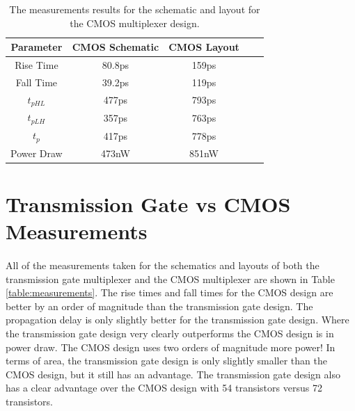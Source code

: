 \documentclass{article}
\begin{document}
  \begin{table}[H]
    \centering
    \footnotesize
    \begin{tabular}{|c|c|c|c|c|}
      \hline
      \textbf{Parameter} & \textbf{CMOS Schematic} & \textbf{CMOS Layout} \\
      \hline
      Rise Time & 80.8ps & 159ps \\
      \hline
      Fall Time & 39.2ps & 119ps\\
      \hline
      $t_{pHL}$ & 477ps & 793ps\\
      \hline
      $t_{pLH}$ & 357ps & 763ps\\
      \hline
      $t_{p}$ & 417ps & 778ps\\
      \hline
      Power Draw & 473nW & 851nW \\
     \hline
    \end{tabular}
    \caption{The measurements results for the schematic and layout for the CMOS multiplexer design.}
    \label{table:cmosmeas}
  \end{table}

\section{Transmission Gate vs CMOS Measurements}
  \paragraph{}
  All of the measurements taken for the schematics and layouts of both the transmission gate multiplexer and the CMOS multiplexer are shown in Table \ref{table:measurements}. The rise times and fall times for the CMOS design are better by an order of magnitude than the transmission gate design. The propagation delay is only slightly better for the transmission gate design. Where the transmission gate design very clearly outperforms the CMOS design is in power draw. The CMOS design uses two orders of magnitude more power! In terms of area, the transmission gate design is only slightly smaller than the CMOS design, but it still has an advantage. The transmission gate design also has a clear advantage over the CMOS design with 54 transistors versus 72 transistors. 
\end{document}
